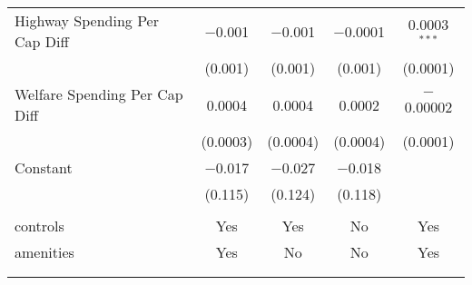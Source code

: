 \begin{table}[!htbp]
\begin{tabular}{@{\extracolsep{5pt}}lcccc}
  Highway Spending Per Cap Diff & $-$0.001 & $-$0.001 & $-$0.0001 & 0.0003$^{***}$ \\ 
  & (0.001) & (0.001) & (0.001) & (0.0001) \\ 
  Welfare Spending Per Cap Diff & 0.0004 & 0.0004 & 0.0002 & $-$0.00002 \\ 
  & (0.0003) & (0.0004) & (0.0004) & (0.0001) \\ 
  Constant & $-$0.017 & $-$0.027 & $-$0.018 &  \\ 
  & (0.115) & (0.124) & (0.118) &  \\ 
 \hline \\[-1.8ex] 
controls & Yes & Yes & No & Yes \\ 
amenities & Yes & No & No & Yes \\ 
\hline \\[-1.8ex] 
\hline 
\hline \\[-1.8ex] 
\end{tabular} 
\end{table} 
